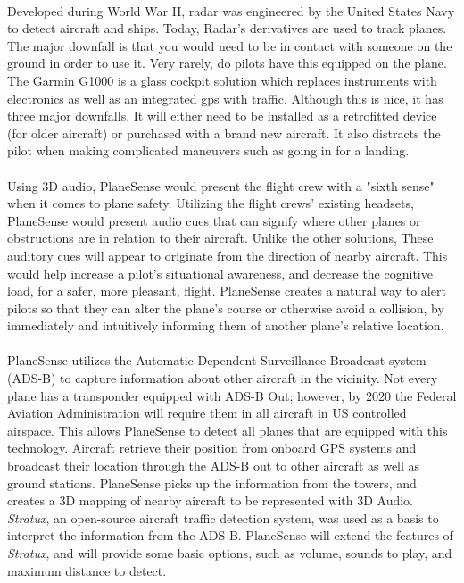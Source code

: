 \paragraph{}
Developed during World War II, radar was engineered by the United States Navy to detect aircraft and ships. Today, Radar's derivatives are used to track planes. The major downfall is that you would need to be in contact with someone on the ground in order to use it. Very rarely, do pilots have this equipped on the plane. The Garmin G1000 is a  glass cockpit solution which replaces instruments with electronics as well as an integrated gps with traffic. Although this is nice, it has three major downfalls. It will either need to be installed as a retrofitted device (for older aircraft) or purchased with a brand new aircraft. It also distracts the pilot when making complicated maneuvers such as going in for a landing.  

\paragraph{}


Using 3D audio, PlaneSense would present the flight crew with a "sixth sense" when it comes to plane safety.  Utilizing the flight crews' existing headsets, PlaneSense would present audio cues that can signify where other planes or obstructions are in relation to their aircraft. Unlike the other solutions, These auditory cues will appear to originate from the direction of nearby aircraft.  This would help increase a pilot's situational awareness, and decrease the cognitive load, for a safer, more pleasant, flight.  PlaneSense creates a natural way to alert pilots so that they can alter the plane's course or otherwise avoid a collision, by immediately and intuitively informing them of another plane's relative location. 




\paragraph{}
PlaneSense utilizes the  Automatic Dependent Surveillance-Broadcast system (ADS-B) to capture information about other aircraft in the vicinity.  Not every plane has a transponder equipped with ADS-B Out; however, by 2020 the Federal Aviation Administration will require them in all aircraft in US controlled airspace. This allows PlaneSense to detect all planes that are equipped with this technology.  Aircraft retrieve their position from onboard GPS systems and broadcast their location through the ADS-B out to other aircraft as well as ground stations. PlaneSense picks up the information from the towers, and creates a 3D mapping of nearby aircraft to be represented with 3D Audio.  \textit{Stratux}, an open-source aircraft traffic detection system, was used as a basis to interpret the information from the ADS-B.
PlaneSense will extend the features of \textit{Stratux}, and will provide some basic options,
such as volume, sounds to play, and maximum distance to detect.


